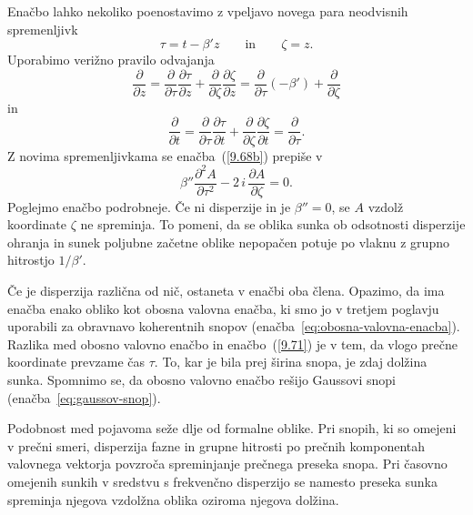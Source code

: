 Enačbo lahko nekoliko poenostavimo z vpeljavo novega para neodvisnih spremenljivk
\begin{equation}
\tau  =  t-\beta'z\nonumber \qquad \mathrm{in} \qquad \zeta = z.
\label{9.70}
\end{equation}
Uporabimo verižno pravilo odvajanja
\begin{equation}
 \frac{\partial}{\partial z}= \frac{\partial}{\partial\tau}\frac{\partial\tau}{\partial z}+ 
 \frac{\partial}{\partial\zeta}\frac{\partial\zeta}{\partial z} = 
 \frac{\partial}{\partial\tau}\left(-\beta'\right)+ \frac{\partial}{\partial \zeta}
\end{equation}
in 
\begin{equation}
 \frac{\partial}{\partial t}= \frac{\partial}{\partial\tau}\frac{\partial\tau}{\partial t}+ 
 \frac{\partial}{\partial\zeta}\frac{\partial\zeta}{\partial t} = 
 \frac{\partial}{\partial\tau}.
\end{equation}
Z novima spremenljivkama se enačba~(\ref{9.68b}) prepiše v 
\begin{equation}
\beta''\frac{\partial^{2}A}{\partial\tau^{2}}-
2\, i\,\frac{\partial A}{\partial\zeta}=0.
\label{9.71}
\end{equation}
Poglejmo enačbo podrobneje. Če ni disperzije in je $\beta''=0$, se $A$
vzdolž koordinate $\zeta$ ne spreminja. To pomeni, da se oblika sunka
ob odsotnosti disperzije ohranja in sunek poljubne začetne oblike nepopačen 
potuje po vlaknu z grupno hitrostjo $1/\beta'$.

Če je disperzija različna od nič, ostaneta v enačbi oba člena. Opazimo, da
ima enačba enako obliko kot obosna valovna enačba, ki smo jo v
tretjem poglavju uporabili za obravnavo koherentnih 
snopov (enačba~\ref{eq:obosna-valovna-enacba}). 
Razlika med obosno valovno enačbo in enačbo~(\ref{9.71}) je v tem, da vlogo
prečne koordinate prevzame čas $\tau$. To, kar je bila prej širina snopa, 
je zdaj dolžina sunka. Spomnimo se, da 
obosno valovno enačbo rešijo Gaussovi snopi (enačba~\ref{eq:gaussov-snop}). 

\begin{remark}
Podobnost med pojavoma seže dlje od formalne oblike. Pri snopih, ki so omejeni 
v prečni smeri, disperzija fazne in grupne hitrosti po prečnih komponentah valovnega
vektorja povzroča spreminjanje prečnega preseka snopa. Pri časovno
omejenih sunkih v sredstvu s frekvenčno disperzijo se namesto preseka sunka
spreminja njegova vzdolžna oblika oziroma njegova dolžina.
\end{remark}


